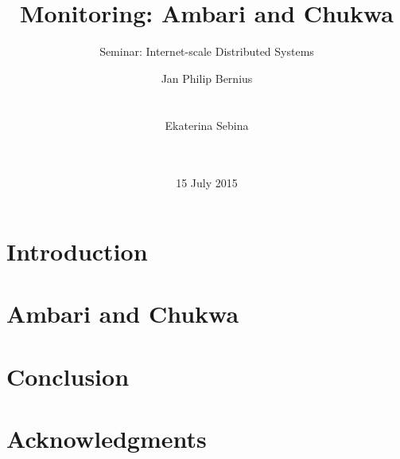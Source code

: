 \documentclass{acm_proc_article-sp}
\begin{document}
\title{Monitoring: Ambari and Chukwa}
\subtitle{Seminar: Internet-scale Distributed Systems}

\author{
\alignauthor
Jan Philip Bernius\\
       \\
       \\
\alignauthor
 Ekaterina Sebina\\
       \\
       \\
}

\date{15 July 2015}

\maketitle

\begin{abstract}
	
\end{abstract}




\section{Introduction}


\section{Ambari and Chukwa}




\section{Conclusion}


\section{Acknowledgments}



\end{document}
